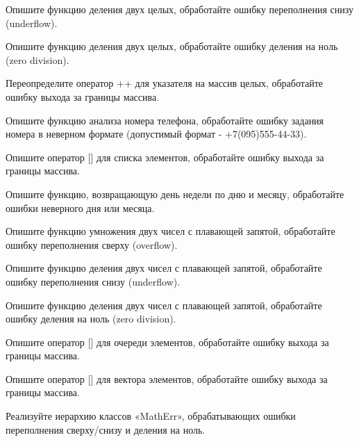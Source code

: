 Опишите функцию деления двух целых, обработайте ошибку переполнения снизу (underflow).

Опишите функцию деления двух целых, обработайте ошибку деления на ноль (zero division).

Переопределите оператор ++ для указателя на массив целых, обработайте ошибку выхода за границы массива.

Опишите функцию анализа номера телефона, обработайте ошибку задания номера в неверном формате (допустимый формат - +7(095)555-44-33).

Опишите оператор [] для списка элементов, обработайте ошибку выхода за границы массива.

Опишите функцию, возвращающую день недели по дню и месяцу, обработайте ошибки неверного дня или месяца.

Опишите функцию умножения двух чисел с плавающей запятой, обработайте ошибку переполнения сверху (overflow).

Опишите функцию деления двух чисел с плавающей запятой, обработайте ошибку переполнения снизу (underflow).

Опишите функцию деления двух чисел с плавающей запятой, обработайте ошибку деления на ноль (zero division).

Опишите оператор [] для очереди элементов, обработайте ошибку выхода за границы массива.

Опишите оператор [] для вектора элементов, обработайте ошибку выхода за границы массива.

Реализуйте иерархию классов «MathErr», обрабатывающих ошибки переполнения сверху/снизу и деления на ноль. 
